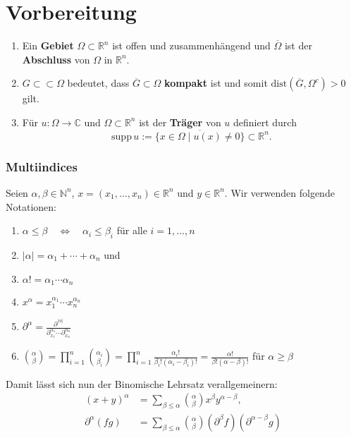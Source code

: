 \documentclass[
paper=a4,
bibtotocnumbered,
liststotocnumbered,
tablecaptionabove,
pointlessnumbers,
twoside,
openright,
10pt
]
{report}
\newcommand{\supp}{\mathrm{supp}\,}
\newcommand{\dist}{\mathrm{dist}}
\theoremstyle{definition}
\numberwithin{equation}{chapter}
\begin{document}
\chapter{Vorbereitung}
\begin{enumerate}[\quad\color{dblue}$\blacktriangleright$]
\item Ein \textbf{Gebiet} $\Omega\subset\mathbb{R}^n$ ist offen und zusammenhängend und $\overline{\Omega}$ ist der \textbf{Abschluss} von $\Omega$ in $\mathbb{R}^n$.
\item $G\subset\subset\Omega$ bedeutet, dass $\overline{G}\subset\Omega$ \textbf{kompakt} ist und somit $\dist(\overline{G},\Omega^c)>0$ gilt.
\item Für $u:\Omega\rightarrow\mathbb{C}$ und $\Omega\subset\mathbb{R}^n$ ist der \textbf{Träger} von $u$ definiert durch
\begin{equation}
\supp u:= \overline{\{x\in\Omega\mid u(x)\neq 0\}}\subset\mathbb{R}^n.
\end{equation}
\end{enumerate}
\subsection*{Multiindices}
Seien $\alpha,\beta\in\mathbb{N}^n$, $x=(x_1,\ldots,x_n)\in\mathbb{R}^n$ und $y\in\mathbb{R}^n$. Wir verwenden folgende Notationen:
\begin{enumerate}[\quad\color{dblue}$\blacktriangleright$]
\item $\alpha\leq\beta\quad\Leftrightarrow\quad \alpha_i\leq\beta_i$ für alle $i=1,\ldots,n$
\item $|\alpha|=\alpha_1+\cdots+\alpha_n$ und 
\item $\alpha! = \alpha_1\cdots\alpha_n$
\item $x^\alpha= x_1^{\alpha_1}\cdots x_n^{\alpha_n}$
\item $\partial^\alpha = \frac{\partial^{|\alpha|}}{\partial_{x_1}^{\alpha_1}\cdots\partial_{x_n}^{\alpha_n}}$
\item $\binom{\alpha}{\beta}=\prod_{i=1}^n \binom{\alpha_i}{\beta_i}=\prod_{i=1}^n \frac{\alpha_i!}{\beta_i!(\alpha_i-\beta_i)!}= \frac{\alpha !}{\beta!(\alpha-\beta
)!}$ für $\alpha\geq\beta$
\end{enumerate}
Damit lässt sich nun der Binomische Lehrsatz verallgemeinern:
\begin{align}
(x+y)^\alpha &= \sum_{\beta\leq\alpha} \binom{\alpha}{\beta} x^\beta y^{\alpha-\beta}, \\
\partial^\alpha (fg) &= \sum_{\beta\leq\alpha} \binom{\alpha}{\beta} (\partial^\beta f)(\partial^{\alpha-\beta}g)
\end{align}
\end{document}
